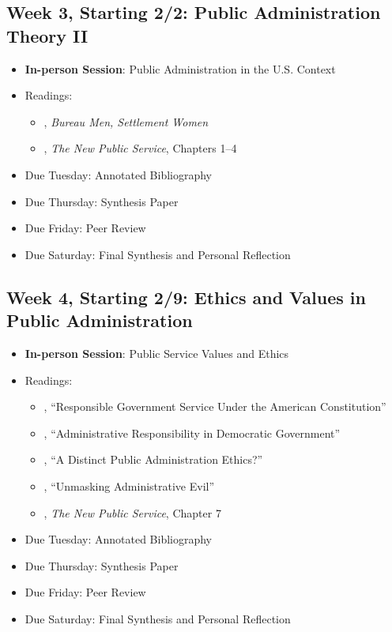 \documentclass[11pt, letterpaper]{article}
\begin{document}
\subsection*{Week 3, Starting 2/2: Public Administration Theory II}
\begin{itemize}
    \item \textbf{In-person Session}: Public Administration in the U.S. Context
    \item Readings:
        \begin{itemize}
            \item \citet{Stivers2000}, \emph{Bureau Men, Settlement Women} 
            \item \citet{Denhardt2015}, \emph{The New Public Service}, Chapters 1--4 
        \end{itemize}
    \item Due Tuesday: Annotated Bibliography
    \item Due Thursday: Synthesis Paper
    \item Due Friday: Peer Review
    \item Due Saturday: Final Synthesis and Personal Reflection
\end{itemize}

\subsection*{Week 4, Starting 2/9: Ethics and Values in Public Administration}
\begin{itemize}
    \item \textbf{In-person Session}: Public Service Values and Ethics
    \item Readings:
        \begin{itemize}
            \item \citet{friedrich1935}, ``Responsible Government Service Under the American Constitution'' 
            \item \citet{FINER1941}, ``Administrative Responsibility in Democratic Government'' 
            \item \citet{goss1996}, ``A Distinct Public Administration Ethics?'' 
            \item \citet{Adams2009}, ``Unmasking Administrative Evil'' 
            \item \citet{Denhardt2015}, \emph{The New Public Service}, Chapter 7 
        \end{itemize}
    \item Due Tuesday: Annotated Bibliography
    \item Due Thursday: Synthesis Paper
    \item Due Friday: Peer Review
    \item Due Saturday: Final Synthesis and Personal Reflection
\end{itemize}
\end{document}
